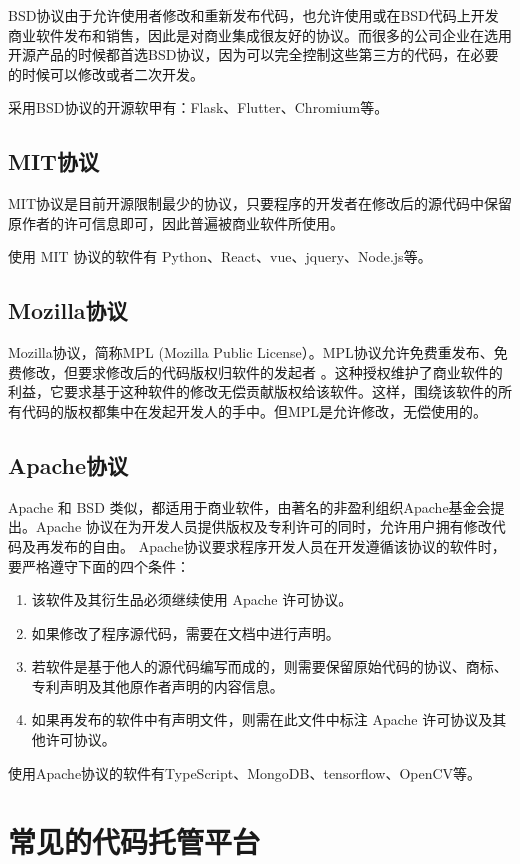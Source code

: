 \documentclass[UTF8]{ctexart}
\begin{document}
BSD协议由于允许使用者修改和重新发布代码，也允许使用或在BSD代码上开发商业软件发布和销售，因此是对商业集成很友好的协议。而很多的公司企业在选用开源产品的时候都首选BSD协议，因为可以完全控制这些第三方的代码，在必要的时候可以修改或者二次开发。

采用BSD协议的开源软甲有：Flask、Flutter、Chromium等。

\subsection{MIT协议}
MIT协议是目前开源限制最少的协议，只要程序的开发者在修改后的源代码中保留原作者的许可信息即可，因此普遍被商业软件所使用。

使用 MIT 协议的软件有 Python、React、vue、jquery、Node.js等。

\subsection{Mozilla协议}
Mozilla协议，简称MPL (Mozilla Public License）。MPL协议允许免费重发布、免费修改，但要求修改后的代码版权归软件的发起者 。这种授权维护了商业软件的利益，它要求基于这种软件的修改无偿贡献版权给该软件。这样，围绕该软件的所有代码的版权都集中在发起开发人的手中。但MPL是允许修改，无偿使用的。

\subsection{Apache协议}
Apache 和 BSD 类似，都适用于商业软件，由著名的非盈利组织Apache基金会提出。Apache 协议在为开发人员提供版权及专利许可的同时，允许用户拥有修改代码及再发布的自由。
Apache协议要求程序开发人员在开发遵循该协议的软件时，要严格遵守下面的四个条件：
\begin{enumerate}
    \item 该软件及其衍生品必须继续使用 Apache 许可协议。
    \item 如果修改了程序源代码，需要在文档中进行声明。
    \item 若软件是基于他人的源代码编写而成的，则需要保留原始代码的协议、商标、专利声明及其他原作者声明的内容信息。
    \item 如果再发布的软件中有声明文件，则需在此文件中标注 Apache 许可协议及其他许可协议。
\end{enumerate}

使用Apache协议的软件有TypeScript、MongoDB、tensorflow、OpenCV等。
\section{常见的代码托管平台}
\end{document}
